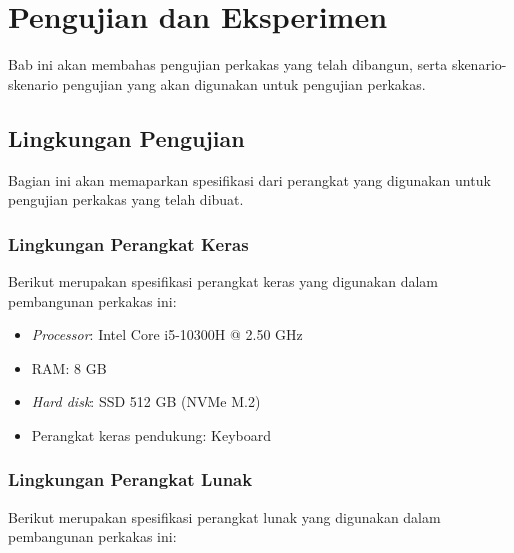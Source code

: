 \chapter{Pengujian dan Eksperimen}
\label{chap:testing}

Bab ini akan membahas pengujian perkakas yang telah dibangun, serta skenario-skenario pengujian yang akan digunakan untuk pengujian perkakas.

\section{Lingkungan Pengujian}
\label{sec:testing-specs}

Bagian ini akan memaparkan spesifikasi dari perangkat yang digunakan untuk pengujian perkakas yang telah dibuat. 

\subsection{Lingkungan Perangkat Keras}
\label{sec:testing-specs-hardware}

Berikut merupakan spesifikasi perangkat keras yang digunakan dalam pembangunan perkakas ini:

\begin{itemize}
	\item \textit{Processor}: Intel\logoregistered\xspace Core\logotrademark\xspace i5-10300H @ 2.50 GHz
	\item RAM: 8 GB
	\item \textit{Hard disk}: SSD 512 GB (NVMe\logotrademark\xspace M.2)
	\item Perangkat keras pendukung: Keyboard
\end{itemize}

\subsection{Lingkungan Perangkat Lunak}
\label{sec:testing-specs-software}

Berikut merupakan spesifikasi perangkat lunak yang digunakan dalam pembangunan perkakas ini:

